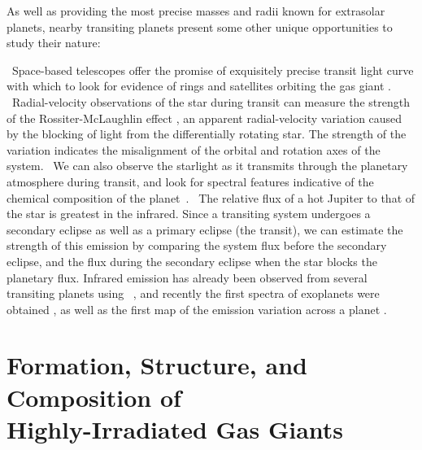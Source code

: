 As well as providing the most precise masses and radii known for extrasolar planets, nearby transiting planets present some other unique opportunities to study their nature:
\begin{enumerate}
\textitem\
Space-based telescopes offer the promise of exquisitely precise transit light curve with which to look for evidence of rings and satellites orbiting the gas giant \citep[see, e.g.,][]{Brown_Charbonneau_Gilliland:apj:2001a}.
\textitem\
Radial-velocity observations of the star during transit can measure the strength of the Rossiter-McLaughlin effect \citep{McLaughlin:apj:1924a,Rossiter:apj:1924a}, an apparent radial-velocity variation caused by the blocking of light from the differentially rotating star.
The strength of the variation indicates the misalignment of the orbital and rotation axes of the system.
\textitem\
We can also observe the starlight as it transmits through the planetary atmosphere during transit, and look for spectral features indicative of the chemical composition of the planet~\citep{Charbonneau_Brown_Noyes:apj:2002a, Vidal-Madjar_Lecavelier-des-Etangs_Desert:nat:2003a, Vidal-Madjar_Desert_Lecavelier-des-Etangs:apjl:2004a, Deming_Brown_Charbonneau:apj:2005a, Barman:apjl:2007a}.
\textitem\
The relative flux of a hot Jupiter to that of the star is greatest in the infrared.
Since a transiting system undergoes a secondary eclipse as well as a primary eclipse (the transit), we can estimate the strength of this emission by comparing the system flux before the secondary eclipse, and the flux during the secondary eclipse when the star blocks the planetary flux.
Infrared emission has already been observed from several transiting planets using \spi\ \citep[see, e.g.,][]{Charbonneau_Allen_Megeath:apj:2005a, Deming_Seager_Richardson:nat:2005a}, and recently the first spectra of exoplanets were obtained \citep{Richardson_Deming_Horning:Nature:2007a, Swain_Bouwman_Akeson:preprint:2007a, Grillmair_Charbonneau_Burrows:apjl:2007a}, as well as the first map of the emission variation across a planet \citep{Knutson_Charbonneau_Allen:nat:2007a}.
\end{enumerate}

\section[Formation, Structure, and Composition of Highly-Irradiated Gas Giants]
{Formation, Structure, and Composition of \\ Highly-Irradiated Gas Giants}\label{cha:intro:sec:form}

